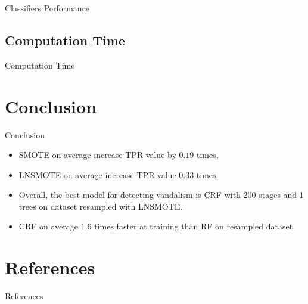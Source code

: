 \documentclass{beamer}
\begin{document}
\begin{frame}
	{Classifiers Performance}
	
\end{frame}

\subsection{Computation Time}

\begin{frame}
	{Computation Time}
	
\end{frame}

\section{Conclusion}

\begin{frame}
	{Conclusion}
	\begin{itemize}
		\item SMOTE on average increase TPR value by $0.19$ times,
		\item LNSMOTE on average increase TPR value $0.33$ times.
		\item Overall, the best model for detecting vandalism is CRF with 200
		stages and 1 trees on dataset resampled with LNSMOTE.
		\item CRF on average $1.6$ times faster at training than RF on resampled dataset.
	\end{itemize}
\end{frame}

\section*{References}

\begin{frame}{References}
\printbibliography
\end{frame}
\end{document}

